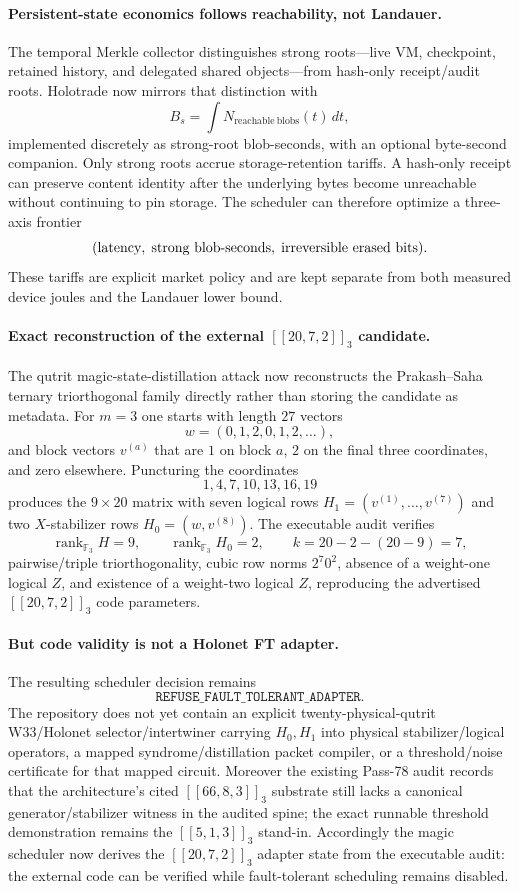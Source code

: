\paragraph{Persistent-state economics follows reachability, not Landauer.}
The temporal Merkle collector distinguishes strong roots---live VM, checkpoint, retained history, and delegated shared objects---from hash-only receipt/audit roots.  Holotrade now mirrors that distinction with
\[
  B_s=\int N_{\mathrm{reachable\ blobs}}(t)\,dt,
\]
implemented discretely as strong-root blob-seconds, with an optional byte-second companion.  Only strong roots accrue storage-retention tariffs.  A hash-only receipt can preserve content identity after the underlying bytes become unreachable without continuing to pin storage.  The scheduler can therefore optimize a three-axis frontier
\[
   (\hbox{latency},\;\hbox{strong blob-seconds},\;\hbox{irreversible erased bits}).
\]
These tariffs are explicit market policy and are kept separate from both measured device joules and the Landauer lower bound.

\paragraph{Exact reconstruction of the external $[[20,7,2]]_3$ candidate.}
The qutrit magic-state-distillation attack now reconstructs the Prakash--Saha ternary triorthogonal family directly rather than storing the candidate as metadata.  For $m=3$ one starts with length $27$ vectors
\[
 w=(0,1,2,0,1,2,\ldots),
\]
and block vectors $v^{(a)}$ that are $1$ on block $a$, $2$ on the final three coordinates, and zero elsewhere.  Puncturing the coordinates
\[
 1,4,7,10,13,16,19
\]
produces the $9\times20$ matrix with seven logical rows
$H_1=(v^{(1)},\ldots,v^{(7)})$ and two $X$-stabilizer rows
$H_0=(w,v^{(8)})$.  The executable audit verifies
\[
 \operatorname{rank}_{\mathbb F_3}H=9,
 \qquad \operatorname{rank}_{\mathbb F_3}H_0=2,
 \qquad k=20-2-(20-9)=7,
\]
pairwise/triple triorthogonality, cubic row norms $2^7 0^2$, absence of a weight-one logical $Z$, and existence of a weight-two logical $Z$, reproducing the advertised $[[20,7,2]]_3$ code parameters.

\paragraph{But code validity is not a Holonet FT adapter.}
The resulting scheduler decision remains
\[
  \boxed{\texttt{REFUSE\_FAULT\_TOLERANT\_ADAPTER}}.
\]
The repository does not yet contain an explicit twenty-physical-qutrit W33/Holonet selector/intertwiner carrying $H_0,H_1$ into physical stabilizer/logical operators, a mapped syndrome/distillation packet compiler, or a threshold/noise certificate for that mapped circuit.  Moreover the existing Pass-78 audit records that the architecture's cited $[[66,8,3]]_3$ substrate still lacks a canonical generator/stabilizer witness in the audited spine; the exact runnable threshold demonstration remains the $[[5,1,3]]_3$ stand-in.  Accordingly the magic scheduler now derives the $[[20,7,2]]_3$ adapter state from the executable audit: the external code can be verified while fault-tolerant scheduling remains disabled.

